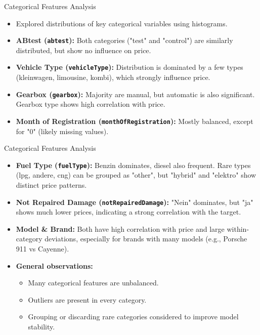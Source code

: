 \documentclass{beamer}
\begin{document}
\begin{frame}{Categorical Features Analysis}
        \begin{itemize}
                \item Explored distributions of key categorical variables using
                        histograms.
                \item \textbf{ABtest (\texttt{abtest}):} Both categories
                        ("test" and "control") are similarly distributed, but
                        show no influence on price.
                \item \textbf{Vehicle Type (\texttt{vehicleType}):}
                        Distribution is dominated by a few types (kleinwagen,
                        limousine, kombi), which strongly influence price.
                \item \textbf{Gearbox (\texttt{gearbox}):} Majority are manual,
                        but automatic is also significant. Gearbox type shows
                        high correlation with price.
                \item \textbf{Month of Registration
                        (\texttt{monthOfRegistration}):} Mostly balanced,
                        except for "0" (likely missing values).
        \end{itemize}
\end{frame}

\begin{frame}{Categorical Features Analysis}
        \begin{itemize}
                \item \textbf{Fuel Type (\texttt{fuelType}):} Benzin dominates,
                        diesel also frequent. Rare types (lpg, andere, cng) can
                        be grouped as "other", but "hybrid" and "elektro" show
                        distinct price patterns.
                \item \textbf{Not Repaired Damage
                        (\texttt{notRepairedDamage}):} "Nein" dominates, but
                        "ja" shows much lower prices, indicating a strong
                        correlation with the target.
                \item \textbf{Model \& Brand:} Both have high correlation with
                        price and large within-category deviations, especially
                        for brands with many models (e.g., Porsche 911 vs
                        Cayenne).
                \item \textbf{General observations:}
                        \begin{itemize}
                                \item Many categorical features are unbalanced.
                                \item Outliers are present in every category.
                                \item Grouping or discarding rare categories
                                        considered to improve model stability.
                        \end{itemize}
        \end{itemize}
\end{frame}
\end{document}
